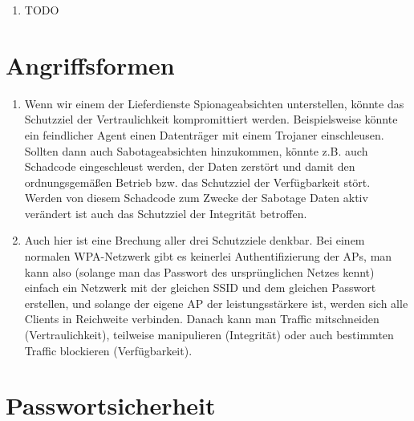 \documentclass[a4paper,11pt]{scrartcl}
\begin{document}
\begin{enumerate}[1.]
    \item TODO
\end{enumerate}

\section{Angriffsformen}
\label{sec:Angriffsformen}

\begin{enumerate}[1.]
    \item
        Wenn wir einem der Lieferdienste Spionageabsichten unterstellen, könnte
        das Schutzziel der Vertraulichkeit kompromittiert werden. Beispielsweise
        könnte ein feindlicher Agent einen Datenträger mit einem Trojaner
        einschleusen. Sollten dann auch Sabotageabsichten hinzukommen, könnte
        z.B. auch Schadcode eingeschleust werden, der Daten zerstört und damit
        den ordnungsgemäßen Betrieb bzw. das Schutzziel der Verfügbarkeit stört.
        Werden von diesem Schadcode zum Zwecke der Sabotage Daten aktiv verändert
        ist auch das Schutzziel der Integrität betroffen.

    \item
        Auch hier ist eine Brechung aller drei Schutzziele denkbar. Bei einem
        normalen WPA-Netzwerk gibt es keinerlei Authentifizierung der APs,
        man kann also (solange man das Passwort des ursprünglichen Netzes kennt)
        einfach ein Netzwerk mit der gleichen SSID und dem gleichen Passwort
        erstellen, und solange der eigene AP der leistungsstärkere ist, werden
        sich alle Clients in Reichweite verbinden. Danach kann man Traffic
        mitschneiden (Vertraulichkeit), teilweise manipulieren (Integrität)
        oder auch bestimmten Traffic blockieren (Verfügbarkeit).
\end{enumerate}

\section{Passwortsicherheit}
\label{sec:Passwortsicherheit}
\end{document}
